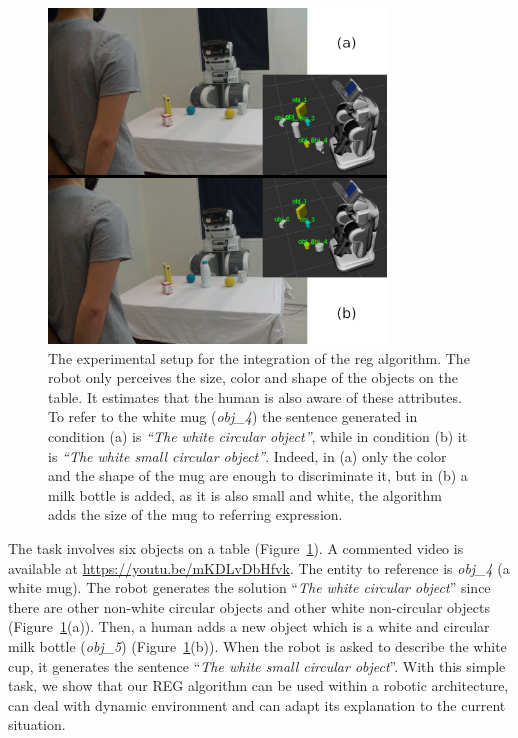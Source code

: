 \documentclass[a4paper,11pt,twoside]{StyleThese}
\begin{document}
\begin{figure}[hbtp]
\centering
\includegraphics[width=0.8\textwidth]{figures/chapter3/REGIntegration.png}
\caption{The experimental setup for the integration of the \acrshort{reg} algorithm. The robot only perceives the size, color and shape of the objects on the table. It estimates that the human is also aware of these attributes. To refer to the white mug (\textit{obj\_4}) the sentence generated in condition (a) is \textit{``The white circular object''}, while in condition (b) it is \textit{``The white small circular object''}. Indeed, in (a) only the color and the shape of the mug are enough to discriminate it, but in (b) a milk bottle is added, as it is also small and white, the algorithm adds the size of the mug to referring expression.}
\label{fig:setupintegrationreg}
\end{figure}

The task involves six objects on a table (Figure~\ref{fig:setupintegrationreg}). A commented video is available at \url{https://youtu.be/mKDLvDbHfvk}. The entity to reference is \textit{obj\_4} (a white mug). The robot generates the solution ``\textit{The white circular object}'' since there are other non-white circular objects and other white non-circular objects (Figure~\ref{fig:setupintegrationreg}(a)). Then, a human adds a new object which is a white and circular milk bottle (\textit{obj\_5}) (Figure~\ref{fig:setupintegrationreg}(b)). When the robot is asked to describe the white cup, it generates the sentence ``\textit{The white small circular object}''. With this simple task, we show that our REG algorithm can be used within a robotic architecture, can deal with dynamic environment and can adapt its explanation to the current situation.
\end{document}
